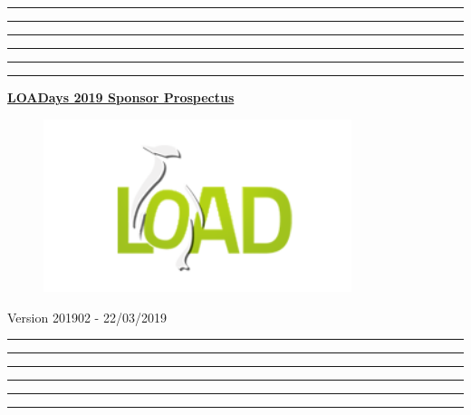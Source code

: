 \documentclass[a4paper,12pt]{article}
\begin{document}
\makeatletter
\renewcommand{\maketitle}{
    \begin{titlepage}
        \thispagestyle{empty}
        \pagenumbering{empty}
        \begin{center}
            \hrule\hrule\hrule\hrule\hrule\hrule
            \vspace{2.5cm}
            \Large{\underline{\textbf{LOADays 2019 Sponsor Prospectus}}}\\
        \end{center}
        \begin{figure}[h!]
            \centering
            \includegraphics[width=9cm]{images/loadays.png}
        \end{figure}
        \begin{center}
            \vspace{3.5cm}
            \scriptsize{Version 201902 - 22/03/2019}
            \hrule\hrule\hrule\hrule\hrule\hrule
        \end{center}
    \end{titlepage}
}
\maketitle

\pagestyle{fancy}
\setcounter{page}{1}
\fancyhead{}
\fancyhead[C]{}
\fancyfoot{}
\fancyfoot[C]{\bfseries\thepage}

%
\def\confdates{4th and 5th May 2019}

%

\end{document}

